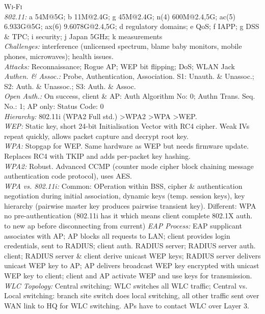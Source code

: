 \documentclass[a4paper, 9pt]{article}
\begin{document}
\textsc{Wi-Fi}\\
\textit{802.11:} a 54M@5G; b 11M@2.4G; g 45M@2.4G; n(4) 600M@2.4,5G; ac(5) 6.933G@5G; ax(6) 9.6078G@2.4,5G; d regulatory domains; e QoS; f IAPP; g DSS \& TPC; i security; j Japan 5GHz; k measurements\\
\textit{Challenges:} interference (unlicensed spectrum, blame baby monitors, mobile phones, microwaves); health issues. \\ 
\textit{Attacks:} Reconnaissance; Rogue AP; WEP bit flipping; DoS; WLAN Jack\\
\textit{Authen. \& Assoc.:} Probe, Authentication, Association. S1: Unauth. \& Unassoc.; S2: Auth. \& Unassoc.; S3: Auth. \& Assoc.\\
\textit{Open Auth.:} On success, client \& AP: Auth Algorithm No: 0; Authn Trans. Seq. No.: 1; AP only: Status Code: 0\\
\textit{Hierarchy:} 802.11i (WPA2 Full std.) \textgreater WPA2 \textgreater WPA \textgreater WEP.\\
\textit{WEP:} Static key, short 24-bit Initialisation Vector with RC4 cipher. Weak IVs repeat quickly, allows packet capture and decrypt root key.\\
\textit{WPA:} Stopgap for WEP. Same hardware as WEP but needs firmware update. Replaces RC4 with TKIP and adds per-packet key hashing.\\
\textit{WPA2:} Robust. Advanced CCMP (counter mode cipher block chaining message authentication code protocol), uses AES. \\
\textit{WPA vs. 802.11i:} Common: OPeration within BSS, cipher \& authentication negotiation during initial association, dynamic keys (temp. session keys), key hierarchy (pairwise master key produces pairwise transient key). Different: WPA no pre-authentication (802.11i has it which means client complete 802.1X auth. to new ap before disconnecting from current)
\textit{EAP Process:} EAP supplicant associates with AP; AP blocks all requests to LAN; client provides login credentials, sent to RADIUS; client auth. RADIUS server; RADIUS server auth. client; RADIUS server \& client derive unicast WEP keys; RADIUS server delivers unicast WEP key to AP; AP delivers broadcast WEP key encrypted with unicast WEP key to client; client and AP activate WEP and use keys for transmission.\\
\textit{WLC Topology:} Central switching: WLC switches all WLC traffic; Central vs. Local switching: branch site switch does local switching, all other traffic sent over WAN link to HQ for WLC switching. APs have to contact WLC over Layer 3. 
\end{document}
